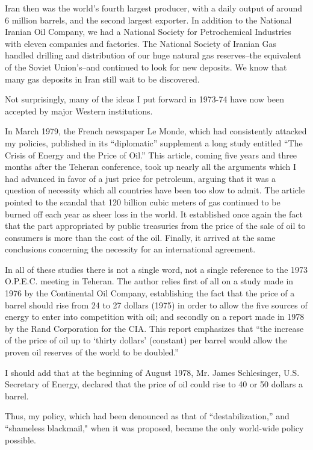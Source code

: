 Iran then was the world’s fourth largest producer, with a daily output of around 6 million barrels, and the second largest exporter. In addition to the National Iranian Oil Company, we had a National Society for Petrochemical Industries with eleven companies and factories. The National Society of Iranian Gas handled drilling and distribution of our huge natural gas reserves--the equivalent of the Soviet Union’s--and continued to look for new deposits. We know that many gas deposits in Iran still wait to be discovered. 


Not surprisingly, many of the ideas I put forward in 1973-74 have now been accepted by major Western institutions. 

In March 1979, the French newspaper Le Monde, which had consistently attacked my policies, published in its “diplomatic” supplement a long study entitled “The Crisis of Energy and the Price of Oil.” This article, coming five years and three months after the Teheran conference, took up nearly all the arguments which I had advanced in favor of a just price for petroleum, arguing that it was a question of necessity which all countries have been too slow to admit. The article pointed to the scandal that 120 billion cubic meters of gas continued to be burned off each year as sheer loss in the world. It established once again the fact that the part appropriated by public treasuries from the price of the sale of oil to consumers is more than the cost of the oil. Finally, it arrived at the same conclusions concerning the necessity for an international agreement. 

In all of these studies there is not a single word, not a single reference to the 1973 O.P.E.C. meeting in Teheran. The author relies first of all on a study made in 1976 by the Continental Oil Company, establishing the fact that the price of a barrel should rise from 24 to 27 dollars (1975) in order to allow the five sources of energy to enter into competition with oil; and secondly on a report made in 1978 by the Rand Corporation for the CIA. This report emphasizes that “the increase of the price of oil up to ‘thirty dollars’ (constant) per barrel would allow the proven oil reserves of the world to be doubled.” 

I should add that at the beginning of August 1978, Mr. James Schlesinger, U.S. Secretary of Energy, declared that the price of oil could rise to 40 or 50 dollars a barrel. 

Thus, my policy, which had been denounced as that of “destabilization,” and “shameless blackmail," when it was proposed, became the only world-wide policy possible. 